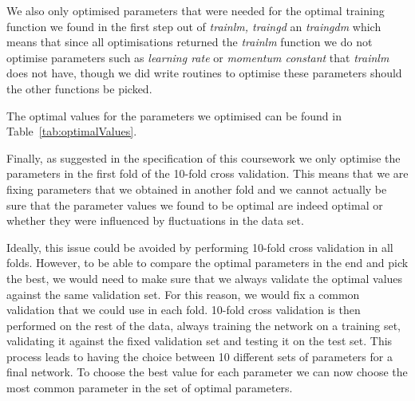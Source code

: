 \documentclass[10pt,a4paper]{article}
\begin{document}
We also only optimised parameters that were needed for the optimal training function we found in the first step out of \emph{trainlm, traingd} an \emph{traingdm} which means that since all optimisations returned the \emph{trainlm} function we do not optimise parameters such as \emph{learning rate} or \emph{momentum constant} that \emph{trainlm} does not have, though we did write routines to optimise these parameters should the other functions be picked.

The optimal values for the parameters we optimised can be found in Table~\ref{tab:optimalValues}.

Finally, as suggested in the specification of this coursework we only optimise the parameters in the first fold of the 10-fold cross validation. This means that we are fixing parameters that we obtained in another fold and we cannot actually be sure that the parameter values we found to be optimal are indeed optimal or whether they were influenced by fluctuations in the data set.

Ideally, this issue could be avoided by performing 10-fold cross validation in all folds. However, to be able to compare the optimal parameters in the end and pick the best, we would need to make sure that we always validate the optimal values against the same validation set. For this reason, we would fix a common validation that we could use in each fold. 10-fold cross validation is then performed on the rest of the data, always training the network on a training set, validating it against the fixed validation set and testing it on the test set. This process leads to having the choice between 10 different sets of parameters for a final network. To choose the best value for each parameter we can now choose the most common parameter in the set of optimal parameters.
\end{document}

